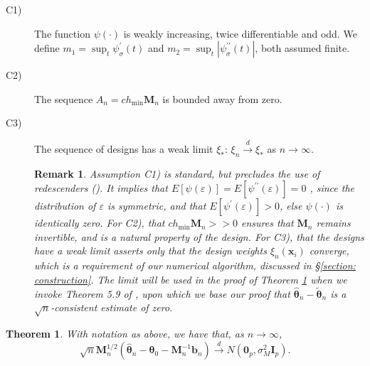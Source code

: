 \documentclass[times, authoryear, 12pt, twoside]{elsarticle}
\newtheorem{theorem}{Theorem}
\newtheorem{remark}{Remark}
\begin{document}
\begin{description}
\item[C1)] The function $\psi \left( \cdot \right) $ is weakly increasing,
twice differentiable and odd. We define $m_{1}=\sup_t \psi _{\sigma }^{\prime }\left(t\right) $ and $m_{2}=\sup_t|\psi _{\sigma }^{\prime \prime }\left(t\right) |$, both assumed finite.

\item[C2)] The sequence $A_{n}=ch_{\min }\boldsymbol{M}_{n}$ is bounded
away from zero.

\item[C3)] The sequence of designs has a weak limit $\xi _{\ast }$: $\xi _{n}%
\overset{d}{\rightarrow }\xi _{\ast }$ as $n\rightarrow \infty $.

\begin{remark}
\label{remark: assumptions}
Assumption C1) is standard, but precludes the use of redescenders (\cite{m04}). It implies that $E\left[ \psi \left( \varepsilon \right) %
\right] =E\left[ \psi ^{\prime \prime }\left( \varepsilon \right) \right] =0$%
, since the distribution of $\varepsilon $ is symmetric, and that $E\left[ \psi
^{\prime }\left( \varepsilon \right) \right] >0$, else $\psi \left( \cdot
\right) $ is identically zero. For C2), that $ch_{\min }\boldsymbol{M}_{n} >>0$ ensures that $\boldsymbol{M}_{n}$ remains invertible,
and is a natural property of the design. For C3), that the designs have a
weak limit asserts only that the design weights $\xi_{n}(\boldsymbol{x}_{i})$ converge, which is
a requirement of our numerical algorithm, discussed in \S \ref{section:
construction}. The limit will be used in the proof of Theorem \ref{thm:main}
when we invoke Theorem 5.9 of \cite{vw98}, upon which we base our proof that 
$\boldsymbol{\hat{\theta}}_{n}-\boldsymbol{\tilde{\theta}}_{n}$ is a $\sqrt{n%
}$-consistent estimate of zero. 
\end{remark}
\end{description}

\begin{theorem}
\label{thm:main}With notation as above, we have that, as $n\rightarrow
\infty $, 
\begin{equation*}
\sqrt{n}\boldsymbol{M}_{n}^{1/2}\left( \boldsymbol{\hat{\theta}}_{n}-%
\boldsymbol{\theta }_{0}-\boldsymbol{M}_{n}^{-1}\boldsymbol{b}%
_{n}\right) \overset{d}{\longrightarrow }N\left( \boldsymbol{0}_p,\sigma
_{M}^{2}\boldsymbol{I}_{p}\right) .
\end{equation*}
\end{theorem}
\end{document}
